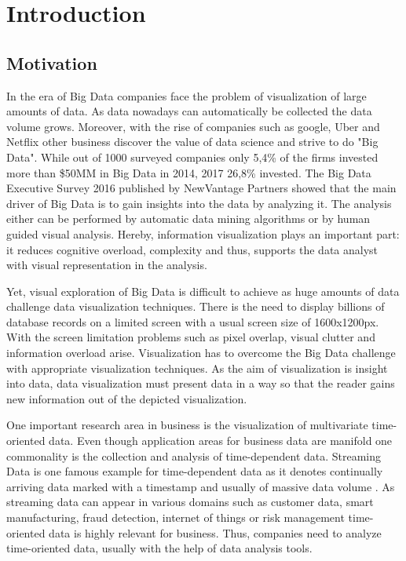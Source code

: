 \chapter{Introduction}
\label{chap:introduction}

\section{Motivation}
In the era of Big Data companies face the problem of visualization of large amounts of data. As data nowadays can automatically be collected the data volume grows. Moreover, with the rise of companies such as google, Uber and Netflix other business discover the value of data science and strive to do "Big Data". While out of 1000 surveyed companies only 5,4\% of the firms invested more than \$50MM in Big Data in 2014, 2017 26,8\% invested. The Big Data Executive Survey 2016 published by NewVantage Partners showed that the main driver of Big Data is to gain insights into the data by analyzing it\cite{Bean2016}. The analysis either can be performed by automatic data mining algorithms or by human guided visual analysis. Hereby, information visualization plays an important part: it reduces cognitive overload, complexity and thus, supports the data analyst with visual representation in the analysis.
\par
 Yet, visual exploration of Big Data is difficult to achieve as huge amounts of data challenge data visualization techniques. There is the need to display billions of database records on a limited screen with a usual screen size of 1600x1200px. With the screen limitation problems such as pixel overlap, visual clutter and information overload arise. Visualization has to overcome the Big Data challenge with appropriate visualization techniques.
As the aim of visualization is insight into data, data visualization must present data in a way so that the reader gains new information out of the depicted visualization.
\par
One important research area in business is the visualization of multivariate time-oriented data. Even though application areas for business data are manifold one commonality is the collection and analysis of time-dependent data. Streaming Data is one famous example for time-dependent data as it denotes continually arriving data marked with a timestamp and usually of massive data volume \cite{o2002streaming} . As streaming data can appear in various domains such as customer data, smart manufacturing, fraud detection, internet of things or risk management time-oriented data is highly relevant for business. Thus, companies need to analyze time-oriented data, usually with the help of data analysis tools. 

